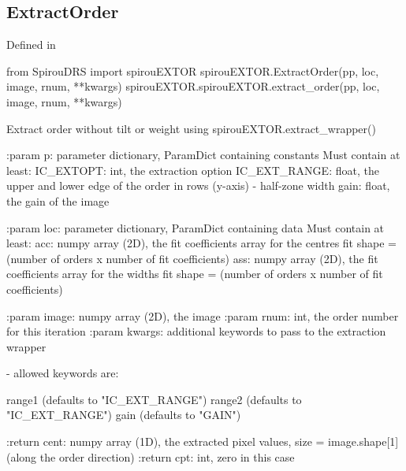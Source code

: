 \noindent\begin{minipage}{\textwidth}
\subsection{ExtractOrder}

Defined in \spirouEXTOR{}

\begin{pythonbox}
from SpirouDRS import spirouEXTOR
spirouEXTOR.ExtractOrder(pp, loc, image, rnum, **kwargs)
spirouEXTOR.spirouEXTOR.extract_order(pp, loc, image, rnum, **kwargs)
\end{pythonbox}

\begin{pythondocstring}
Extract order without tilt or weight using spirouEXTOR.extract_wrapper()

:param p: parameter dictionary, ParamDict containing constants
    Must contain at least:
            IC_EXTOPT: int, the extraction option
            IC_EXT_RANGE: float, the upper and lower edge of the order
                          in rows (y-axis) - half-zone width
            gain: float, the gain of the image

:param loc: parameter dictionary, ParamDict containing data
        Must contain at least:
            acc: numpy array (2D), the fit coefficients array for
                  the centres fit
                  shape = (number of orders x number of fit coefficients)
            ass: numpy array (2D), the fit coefficients array for
                  the widths fit
                  shape = (number of orders x number of fit coefficients)

:param image: numpy array (2D), the image
:param rnum: int, the order number for this iteration
:param kwargs: additional keywords to pass to the extraction wrapper

        - allowed keywords are:

        range1  (defaults to "IC_EXT_RANGE")
        range2  (defaults to "IC_EXT_RANGE")
        gain    (defaults to "GAIN")

:return cent: numpy array (1D), the extracted pixel values,
             size = image.shape[1] (along the order direction)
:return cpt: int, zero in this case
\end{pythondocstring}
\end{minipage}


